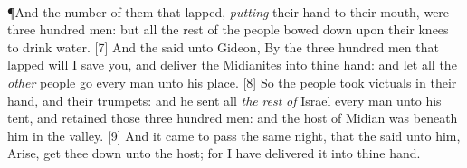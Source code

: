 {\\
\P \textcolor[rgb]{0.00,0.00,1.00}{And the number of them that lapped, \emph{putting} their hand to their mouth, were three hundred men: but all the rest of the people bowed down upon their knees to drink water.}
[7] \textcolor[rgb]{0.00,0.00,1.00}{And the  said unto Gideon, By the three hundred men that lapped will I save you, and deliver the Midianites into thine hand: and let all the \emph{other} people go every man unto his place.}%
[8] \textcolor[rgb]{0.00,0.00,1.00}{So the people took victuals in their hand, and their trumpets: and he sent all \emph{the} \emph{rest} \emph{of} Israel every man unto his tent, and retained those three hundred men: and the host of Midian was beneath him in the valley.}
[9] \textcolor[rgb]{0.00,0.00,1.00}{And it came to pass the same night, that the  said unto him, Arise, get thee down unto the host; for I have delivered it into thine hand.}\\
}
